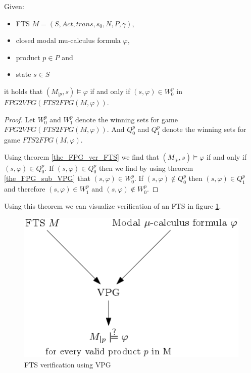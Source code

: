 \begin{theorem}
	\label{the_VPG_ver_FTS}
	Given:
	\begin{itemize}
		\item FTS $M = (S, Act, trans, s_0, N, P, \gamma)$,
		\item closed modal mu-calculus formula $\varphi$,
		\item product $p \in P$ and
		\item state $s \in S$
	\end{itemize}
	it holds that $(M_{|p}, s) \models \varphi$ if and only if $(s, \varphi) \in W_0^{p}$ in $\textit{FPG2VPG}(\textit{FTS2FPG}(M, \varphi))$.
	\begin{proof}
		Let $W_0^{p}$ and $W_1^{p}$ denote the winning sets for game $\textit{FPG2VPG}(\textit{FTS2FPG}(M, \varphi))$. And $Q_0^{p}$ and $Q_1^{p}$ denote the winning sets for game $\textit{FTS2FPG}(M, \varphi)$.
		
		Using theorem \ref{the_FPG_ver_FTS} we find that $(M_{|p}, s) \models \varphi$ if and only if $(s, \varphi) \in Q_0^{p}$. If $(s, \varphi) \in Q_0^{p}$ then we find by using theorem \ref{the_FPG_sub_VPG} that $(s, \varphi) \in W_0^{p}$. If $(s, \varphi) \not\in Q_0^{p}$ then $(s, \varphi) \in Q_1^{p}$ and therefore $(s, \varphi) \in W_1^{p}$ and $(s, \varphi) \not\in W_0^{p}$.
	\end{proof}
\end{theorem}
Using this theorem we can visualize verification of an FTS in figure \ref{fig:ftsverificationusingvpg}.
\begin{figure}[h]
	\centering
	\includegraphics[scale=0.5]{Diagrams/FTSVerificationUsingVPG}
	\caption[FTS verification using VPG]{FTS verification using VPG}
	\label{fig:ftsverificationusingvpg}
\end{figure}
